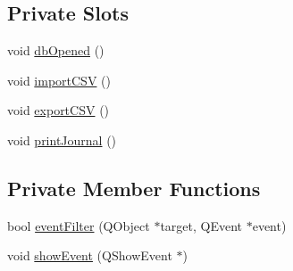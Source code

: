 \subsection*{Private Slots}
\begin{CompactItemize}
\item 
void \hyperlink{classJournalStack_k0}{db\-Opened} ()
\item 
void \hyperlink{classJournalStack_k1}{import\-CSV} ()
\item 
void \hyperlink{classJournalStack_k2}{export\-CSV} ()
\item 
void \hyperlink{classJournalStack_k3}{print\-Journal} ()
\end{CompactItemize}
\subsection*{Private Member Functions}
\begin{CompactItemize}
\item 
bool \hyperlink{classJournalStack_d0}{event\-Filter} (QObject $\ast$target, QEvent $\ast$event)
\item 
void \hyperlink{classJournalStack_d1}{show\-Event} (QShow\-Event $\ast$)
\end{CompactItemize}

